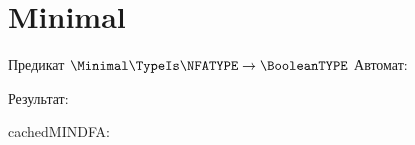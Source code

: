 \section{Minimal}
\begin{frame}{Предикат $\Minimal\TypeIs\NFATYPE\to\BooleanTYPE$}
	Автомат:


	Результат:

	cachedMINDFA:


\end{frame}

